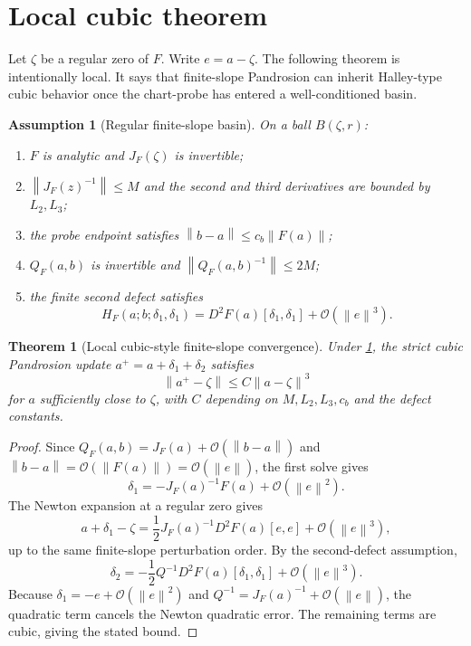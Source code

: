 \documentclass[11pt]{article}
\newtheorem{assumption}[definition]{Assumption}
\newtheorem{theorem}[definition]{Theorem}
\newcommand{\OO}{\mathcal O}
\newcommand{\norm}[1]{\left\lVert #1\right\rVert}
\begin{document}
\section{Local cubic theorem}

Let $\zeta$ be a regular zero of $F$.  Write $e=a-\zeta$.  The following theorem is intentionally local.  It says that finite-slope Pandrosion can inherit Halley-type cubic behavior once the chart-probe has entered a well-conditioned basin.

\begin{assumption}[Regular finite-slope basin]\label{ass:basin}
On a ball $B(\zeta,r)$:
\begin{enumerate}[label=(\roman*)]
\item $F$ is analytic and $J_F(\zeta)$ is invertible;
\item $\norm{J_F(z)^{-1}}\le M$ and the second and third derivatives are bounded by $L_2,L_3$;
\item the probe endpoint satisfies $\norm{b-a}\le c_b\norm{F(a)}$;
\item $Q_F(a,b)$ is invertible and $\norm{Q_F(a,b)^{-1}}\le 2M$;
\item the finite second defect satisfies
\[
        H_F(a;b;\delta_1,\delta_1)=D^2F(a)[\delta_1,\delta_1]+\OO(\norm{e}^3).
\]
\end{enumerate}
\end{assumption}

\begin{theorem}[Local cubic-style finite-slope convergence]\label{thm:local-cubic}
Under \cref{ass:basin}, the strict cubic Pandrosion update $a^+=a+\delta_1+\delta_2$ satisfies
\[
        \norm{a^+-\zeta}\le C\norm{a-\zeta}^3
\]
for $a$ sufficiently close to $\zeta$, with $C$ depending on $M,L_2,L_3,c_b$ and the defect constants.
\end{theorem}

\begin{proof}
Since $Q_F(a,b)=J_F(a)+\OO(\norm{b-a})$ and $\norm{b-a}=\OO(\norm{F(a)})=\OO(\norm e)$, the first solve gives
\[
        \delta_1=-J_F(a)^{-1}F(a)+\OO(\norm e^2).
\]
The Newton expansion at a regular zero gives
\[
        a+\delta_1-\zeta=\frac12 J_F(a)^{-1}D^2F(a)[e,e]+\OO(\norm e^3),
\]
up to the same finite-slope perturbation order.  By the second-defect assumption,
\[
        \delta_2=-\frac12 Q^{-1}D^2F(a)[\delta_1,\delta_1]+\OO(\norm e^3).
\]
Because $\delta_1=-e+\OO(\norm e^2)$ and $Q^{-1}=J_F(a)^{-1}+\OO(\norm e)$, the quadratic term cancels the Newton quadratic error.  The remaining terms are cubic, giving the stated bound.
\end{proof}
\end{document}
